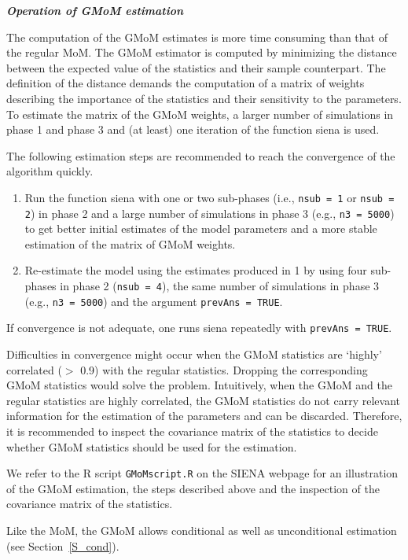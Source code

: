 \documentclass[a4paper,fleqn,11pt]{article}
\newcommand{\+}{\, + \,}
\newcommand{\R}{{\sf R }}
\newcommand{\SI}{{\sf SIENA }}
\begin{document}
\noindent
\textbf{\emph{Operation of GMoM estimation }}
\medskip

The computation of the GMoM estimates is more time consuming than that of the regular MoM.
The GMoM estimator is computed by minimizing the distance between the
expected value of the statistics and their sample counterpart.
The definition of the distance demands the computation of a matrix of weights
describing the importance of the statistics and their sensitivity
to the parameters. To estimate the matrix of the GMoM weights, a larger number of simulations
in phase 1 and phase 3 and (at least) one iteration of the function \textsf{siena} is used.

The following estimation steps are recommended to reach the convergence of the algorithm quickly.
\begin{enumerate}
	\item  Run the function \textsf{siena} with one or two sub-phases (i.e.,
\texttt{nsub = 1} or \texttt{nsub = 2}) in phase 2 and a large number of simulations in phase 3
(e.g., \texttt{n3 = 5000}) to get better initial estimates of the model parameters and a
more stable estimation of the matrix of GMoM weights.
 \item Re-estimate the model using the estimates produced in 1 by using four sub-phases in phase 2
(\texttt{nsub = 4}), the same number of simulations in phase 3 (e.g., \texttt{n3 = 5000}) and the
argument \texttt{prevAns = TRUE}.
\end{enumerate}
If convergence is not adequate, one runs \textsf{siena} repeatedly with \texttt{prevAns = TRUE}.

Difficulties in convergence might occur when the GMoM statistics are `highly' correlated ($>$ 0.9) with the regular statistics. Dropping the corresponding GMoM statistics would solve the problem. Intuitively, when the GMoM and the regular statistics are highly correlated, the GMoM statistics do not carry relevant information
for the estimation of the parameters and can be discarded. Therefore, it is recommended to inspect the covariance matrix of the statistics to decide whether GMoM statistics should be used for the estimation.

We refer to  the  \R script \texttt{GMoMscript.R} on the \SI webpage for an illustration of the GMoM estimation, the steps described above and the inspection of the covariance matrix of the statistics.

Like the MoM, the GMoM allows conditional as well as unconditional estimation (see Section~\ref{S_cond}).
\end{document}
